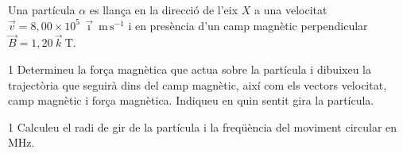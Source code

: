 Una partícula $\alpha$ es llança en la direcció de l'eix $X$ a una velocitat $\vec{v} = 8,00\times 10^{5}\,\vec{\imath}\ \mathrm{m\,s^{-1}}$ i en presència d'un camp magnètic perpendicular $\vec{B} = 1,20\,\vec{k}\ \mathrm{T}$.

\begin{apartat}{1}
Determineu la força magnètica que actua sobre la partícula i dibuixeu la trajectòria que seguirà dins del camp magnètic, així com els vectors velocitat, camp magnètic i força magnètica. Indiqueu en quin sentit gira la partícula.
\end{apartat}

\begin{apartat}{1}
Calculeu el radi de gir de la partícula i la freqüència del moviment circular en MHz.
\end{apartat}

